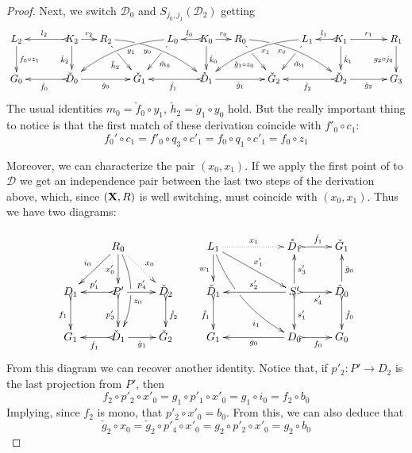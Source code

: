 \documentclass[a4paper,UKenglish,cleveref,pdftex,thm-restate,numberwithinsect,anonymous]{lipics}
\def\R{\mathsf{R}}
\def\X{\textbf {\textup{X}}}
\def\G{\textbf {\textup{G}}}
\newcommand{\dder}[1]{\mathscr{#1}}
\begin{document}
\begin{proof}
	Next, we switch $\dder{D}_0$ and $S_{j_0, j_1}(\dder{D}_2)$ getting
	\[\xymatrix@C=15pt{L_2\ar[d]^{f_0\circ z_1}&& K_2 \ar[d]_{\mathring{k}_2}\ar@{>->}[ll]_{l_2} \ar[r]^{r_2} & R_2 \ar@/^.35cm/[drrr]_(.4){y_0}|(.285)\hole \ar[dr]|(.28)\hole_{\mathring{h}_2} && L_0 \ar@/_.35cm/[dlll]^(.4){y_1} \ar[dl]|(.28)\hole^{\check{m}_0}& K_0 \ar[d]^{\check{k}_0}\ar@{>->}[l]_{l_0} \ar[r]^{r_0} & R_0 \ar[dr]|(.28)\hole_{\check{g}_1\circ z_0} \ar@/^.35cm/[drrr]_(.4){x_0}|(.285)\hole  && L_1 \ar@/_.35cm/[dlll]^(.4){x_1} \ar[dl]|(.28)\hole^{\check{m}_1}& K_1 \ar[d]^{\check{k}_1}\ar@{>->}[l]_{l_1} \ar[rr]^{r_1} && R_1\ar[d]_{g_2\circ j_0} \\G_0 && \ar@{>->}[ll]^{\check{f}_0} \check{D}_0 \ar[rr]_{\check{g}_0}&& \check{G}_1  && \ar@{>->}[ll]^{\mathring{f}_1} \mathring{D}_1 \ar[rr]_{\mathring{g}_1}&& \check{G}_2 && \ar@{>->}[ll]^{\check{f}_2} \check{D}_2 \ar[rr]_{\check{g}_2}&& G_3 }\]
	The usual identities $m_0=\check{f}_0\circ y_1$, $\check{h}_2=\mathring{g}_1\circ y_0$ hold. But the really important thing to notice is that the first match of these derivation coincide with $f'_0\circ c_1$:
	\[	f_0'\circ c_1  =f'_0\circ q_3\circ c'_1 =f_0\circ q_1\circ c'_1=f_0\circ z_1\]
	
	Moreover, we can characterize the pair $(x_0, x_1)$. If we apply the first point of  to $\dder{D}$ we get an independence pair between the last two steps of the derivation above, which, since $(\X, \R)$ is well switching, must coincide with $(x_0, x_1)$. Thus we have two diagrams:
	
	\[\xymatrix{&R_0 \ar[dl]_{i_0} \ar@{.>}[dr]^{x_0} \ar@/^.4cm/[dd]|\hole^(.6){z_0}\ar[d]_{x'_0}&&L_ 1\ar[d]_{w_1} \ar@/_.4cm/[ddrr]|(.41)\hole_(.7){i_1}\ar[drr]^{x'_1} \ar@{.>}[rr]^{x_1}&&\mathring{D}_1 \ar@{>->}[r]^{\mathring{f}_1}&\check{G}_1\\ D_1 \ar@{>->}[d]_{f_1}&P'\ar@{>->}[d]_{p'_3} \ar[r]^{p'_4} \ar@{>->}[l]_{p'_1}&\check{D}_2\ar@{>->}[d]^{\check{f}_2}&\check{D}_1 \ar@{>->}[d]_{\hat{f}_1}&&S'\ar@{>->}[r]_{s'_4} \ar[u]_{s'_3}\ar@{>->}[d]^{s'_1} \ar[ll]_{s'_2} &\hat{D}_0 \ar[u]_{\hat{g}_0} \ar@{>->}[d]^{\hat{f}_0}\\G_1&\check{D}_1 \ar@{>->}[l]^{\check{f}_1}\ar[r]_{\check{g}_1}& \check{G}_2&G_1 && D_0 \ar[ll]^{g_0}  \ar@{>->}[r]_{f_0}& G_0 }\]
	From this diagram we can recover another identity. Notice that, if $p'_2\colon P'\to D_2$ is the last projection from $P'$, then
	\[f_2\circ p'_2\circ x'_0=g_1\circ p'_1\circ x'_0=g_1\circ i_0=f_2\circ b_0\]
	Implying, since $f_2$ is mono, that $p'_2\circ x'_0=b_0$. From this, we can also deduce that 
	\[\check{g}_2\circ x_0=\check{g}_2\circ p'_4\circ x'_0=g_2\circ p'_2\circ x'_0=g_2\circ b_0 \]
	

\end{proof}
\end{document}
